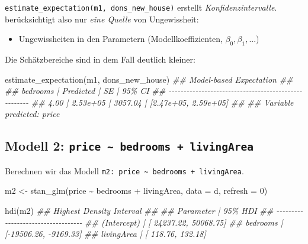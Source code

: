 \documentclass[
  a4paper,
  DIV=11]{scrreprt}
\newenvironment{Shaded}{\begin{snugshade}}{\end{snugshade}}
\newcommand{\AttributeTok}[1]{\textcolor[rgb]{0.40,0.45,0.13}{#1}}
\newcommand{\DecValTok}[1]{\textcolor[rgb]{0.68,0.00,0.00}{#1}}
\newcommand{\DocumentationTok}[1]{\textcolor[rgb]{0.37,0.37,0.37}{\textit{#1}}}
\newcommand{\FunctionTok}[1]{\textcolor[rgb]{0.28,0.35,0.67}{#1}}
\newcommand{\NormalTok}[1]{\textcolor[rgb]{0.00,0.23,0.31}{#1}}
\newcommand{\OtherTok}[1]{\textcolor[rgb]{0.00,0.23,0.31}{#1}}
\newcommand{\SpecialCharTok}[1]{\textcolor[rgb]{0.37,0.37,0.37}{#1}}
\providecommand{\tightlist}{%
  \setlength{\itemsep}{0pt}\setlength{\parskip}{0pt}}\usepackage{longtable,booktabs,array}
\theoremstyle{definition}
\theoremstyle{remark}
\begin{document}
\texttt{estimate\_expectation(m1,\ dons\_new\_house)} erstellt
\emph{Konfidenzintervalle}. berücksichtigt also nur \emph{eine Quelle}
von Ungewissheit:

\begin{itemize}
\tightlist
\item
  Ungewissheiten in den Parametern (Modellkoeffizienten,
  \(\beta_0, \beta_1, ...\))
\end{itemize}

Die Schätzbereiche sind in dem Fall deutlich kleiner:

\begin{Shaded}
\begin{Highlighting}[]
\FunctionTok{estimate\_expectation}\NormalTok{(m1, dons\_new\_house)}
\DocumentationTok{\#\# Model{-}based Expectation}
\DocumentationTok{\#\# }
\DocumentationTok{\#\# bedrooms | Predicted |      SE |               95\% CI}
\DocumentationTok{\#\# {-}{-}{-}{-}{-}{-}{-}{-}{-}{-}{-}{-}{-}{-}{-}{-}{-}{-}{-}{-}{-}{-}{-}{-}{-}{-}{-}{-}{-}{-}{-}{-}{-}{-}{-}{-}{-}{-}{-}{-}{-}{-}{-}{-}{-}{-}{-}{-}{-}{-}{-}{-}{-}}
\DocumentationTok{\#\# 4.00     |  2.53e+05 | 3057.04 | [2.47e+05, 2.59e+05]}
\DocumentationTok{\#\# }
\DocumentationTok{\#\# Variable predicted: price}
\end{Highlighting}
\end{Shaded}

\hypertarget{modell-2-price-bedrooms-livingarea}{%
\subsection{\texorpdfstring{Modell 2:
\texttt{price\ \textasciitilde{}\ bedrooms\ +\ livingArea}}{Modell 2: price \textasciitilde{} bedrooms + livingArea}}\label{modell-2-price-bedrooms-livingarea}}

Berechnen wir das Modell
\texttt{m2:\ price\ \textasciitilde{}\ bedrooms\ +\ livingArea}.

\begin{Shaded}
\begin{Highlighting}[]
\NormalTok{m2 }\OtherTok{\textless{}{-}} \FunctionTok{stan\_glm}\NormalTok{(price }\SpecialCharTok{\textasciitilde{}}\NormalTok{ bedrooms }\SpecialCharTok{+}\NormalTok{ livingArea, }\AttributeTok{data =}\NormalTok{ d, }\AttributeTok{refresh =} \DecValTok{0}\NormalTok{)}

\FunctionTok{hdi}\NormalTok{(m2)}
\DocumentationTok{\#\# Highest Density Interval}
\DocumentationTok{\#\# }
\DocumentationTok{\#\# Parameter   |               95\% HDI}
\DocumentationTok{\#\# {-}{-}{-}{-}{-}{-}{-}{-}{-}{-}{-}{-}{-}{-}{-}{-}{-}{-}{-}{-}{-}{-}{-}{-}{-}{-}{-}{-}{-}{-}{-}{-}{-}{-}{-}}
\DocumentationTok{\#\# (Intercept) | [ 24237.22, 50068.75]}
\DocumentationTok{\#\# bedrooms    | [{-}19506.26, {-}9169.33]}
\DocumentationTok{\#\# livingArea  | [   118.76,   132.18]}
\end{Highlighting}
\end{Shaded}
\end{document}

